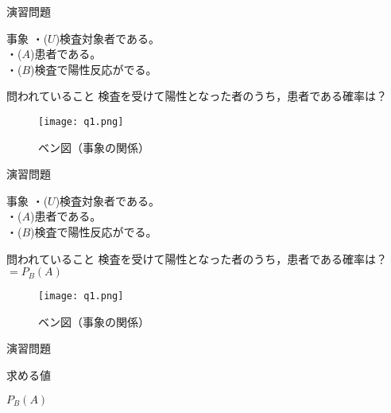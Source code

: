 \documentclass[aspectratio=169, dvipdfmx, 11pt]{beamer}
\begin{document}
\begin{frame}{演習問題}

\begin{alertblock}{事象}
・($U$)検査対象者である。\\
・($A$)患者である。\\
・($B$)検査で陽性反応がでる。\\
\end{alertblock}

\begin{alertblock}{問われていること}
検査を受けて陽性となった者のうち，患者である確率は？
\end{alertblock}

\begin{figure}[H]
  \begin{center}
    \texttt{[image: q1.png]}
    \caption{ベン図（事象の関係）}
    \label{fig:graph5}
  \end{center}
\end{figure}

\end{frame}


\begin{frame}{演習問題}

\begin{alertblock}{事象}
・($U$)検査対象者である。\\
・($A$)患者である。\\
・($B$)検査で陽性反応がでる。\\
\end{alertblock}

\begin{alertblock}{問われていること}
検査を受けて陽性となった者のうち，患者である確率は？$=P_B(A)$
\end{alertblock}

\begin{figure}[H]
  \begin{center}
    \texttt{[image: q1.png]}
    \caption{ベン図（事象の関係）}
    \label{fig:graph5}
  \end{center}
\end{figure}

\end{frame}


\begin{frame}{演習問題}

\begin{alertblock}{求める値}
\begin{center}
$P_B(A)$
\end{center}
\end{alertblock}

\end{frame}
\end{document}
